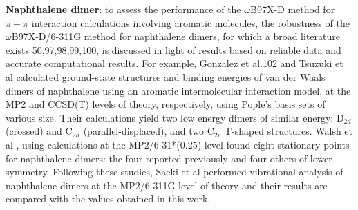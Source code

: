 \textbf{Naphthalene dimer}: to assess the performance of the $\omega$B97X-D method for $\pi -\pi$ interaction calculations involving aromatic molecules, the robustness of the $\omega$B97X-D/6-311G method for naphthalene dimers, for which a broad literature exists \cite{saeki2006theoretical,brillante2002raman} 50,97,98,99,100, is discussed in light of results based on reliable data and accurate computational results. For example, Gonzalez et al.102 and Tsuzuki et al \cite{tsuzuki2004high} calculated ground-state structures and binding energies of van der Waals dimers of naphthalene using an aromatic intermolecular interaction model, at the MP2 and CCSD(T) levels of theory, respectively, using Pople’s basis sets of various size. Their calculations yield two low energy dimers of similar energy: D$_{2d}$ (crossed) and C$_{2h}$ (parallel-displaced), and two C$_{2v}$ T-shaped structures. Walsh et al \cite{walsh2002ab,rubevs2008investigation}, using calculations at the MP2/6-31*(0.25) level found eight stationary points for naphthalene dimers: the four reported previously and four others of lower symmetry. Following these studies, Saeki et al \cite{saeki2006theoretical} performed vibrational analysis of naphthalene dimers at the MP2/6-311G level of theory and their results are compared with the values obtained in this work. 
